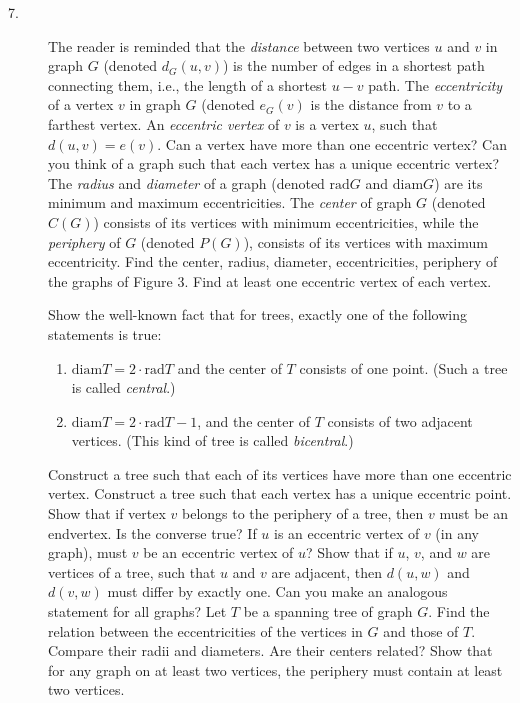 \documentclass{article}
\begin{document}
\begin{description}
\item[7.] The reader is reminded that the \emph{distance} between two vertices $u$ and $v$ in graph $G$ (denoted $d_G(u,v)$) is the number of edges in a shortest path connecting them, i.e., the length of a shortest $u-v$ path. The \emph{eccentricity} of a vertex $v$ in graph $G$ (denoted $e_G(v)$ is the distance from $v$ to a farthest vertex. An \emph{eccentric vertex} of $v$ is a vertex $u$, such that $d(u,v) = e(v)$. Can a vertex have more than one eccentric vertex? Can you think of a graph such that each vertex has a unique eccentric vertex? The \emph{radius} and \emph{diameter} of a graph (denoted $\text{rad} G$ and $\text{diam} G$) are its minimum and maximum eccentricities. The \emph{center} of graph $G$ (denoted $C(G)$) consists of its vertices with minimum eccentricities, while the \emph{periphery} of $G$ (denoted $P(G)$), consists of its vertices with maximum eccentricity. Find the center, radius, diameter, eccentricities, periphery of the graphs of Figure 3. Find at least one eccentric vertex of each vertex.

  Show the well-known fact that for trees, exactly one of the following statements is true:
  \begin{enumerate}[\hspace{1cm}(1)]
    \item $\text{diam} T = 2 \cdot \text{rad} T$ and the center of $T$ consists of one point. (Such a tree is called \emph{central}.)
    \item $\text{diam} T = 2 \cdot \text{rad} T-1$, and the center of $T$ consists of two adjacent vertices. (This kind of tree is called \emph{bicentral}.)
  \end{enumerate}
  Construct a tree such that each of its vertices have more than one eccentric vertex. Construct a tree such that each vertex has a unique eccentric point. Show that if vertex $v$ belongs to the periphery of a tree, then $v$ must be an endvertex. Is the converse true? If $u$ is an eccentric vertex of $v$ (in any graph), must $v$ be an eccentric vertex of $u$? Show that if $u$, $v$, and $w$ are vertices of a tree, such that $u$ and $v$ are adjacent, then $d(u,w)$ and $d(v,w)$ must differ by exactly one. Can you make an analogous statement for all graphs? Let $T$ be a spanning tree of graph $G$. Find the relation between the eccentricities of the vertices in $G$ and those of $T$. Compare their radii and diameters. Are their centers related? Show that for any graph on at least two vertices, the periphery must contain at least two vertices.


\end{description}
\end{document}
